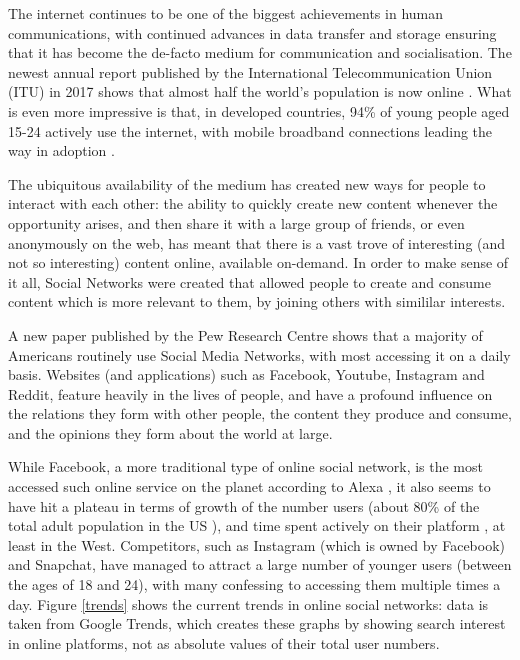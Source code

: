 \documentclass[bsc,frontabs,twoside,singlespacing,parskip,deptreport]{infthesis}
\begin{document}
The internet continues to be one of the biggest achievements in human communications, with continued advances in data transfer and storage ensuring that it has become the de-facto medium for communication and socialisation. The newest annual report published by the International Telecommunication Union (ITU) in 2017 shows that almost half the world's population is now online \cite{ICT2017}. What is even more impressive is that, in developed countries, 94\% of young people aged 15-24 actively use the internet, with mobile broadband connections leading the way in adoption \cite{ICT2017}.

The ubiquitous availability of the medium has created new ways for people to interact with each other: the ability to quickly create new content whenever the opportunity arises, and then share it with a large group of friends, or even anonymously on the web, has meant that there is a vast trove of interesting (and not so interesting) content online, available on-demand. In order to make sense of it all, Social Networks were created that allowed people to create and consume content which is more relevant to them, by joining others with simililar interests.

A new paper published by the Pew Research Centre \cite{pew} shows that a majority of Americans routinely use Social Media Networks, with most accessing it on a daily basis. Websites (and applications) such as Facebook, Youtube, Instagram and Reddit, feature heavily in the lives of people, and have a profound influence on the relations they form with other people, the content they produce and consume, and the opinions they form about the world at large. 

While Facebook, a more traditional type of online social network, is the most accessed such online service on the planet according to Alexa \cite{alexa}, it also seems to have hit a plateau in terms of growth of the number users (about 80\% of the total adult population in the US \cite{pew}), and time spent actively on their platform \cite{pew}, at least in the West. Competitors, such as Instagram (which is owned by Facebook) and Snapchat, have managed to attract a large number of younger users (between the ages of 18 and 24), with many confessing to accessing them multiple times a day. Figure \ref{trends} shows the current trends in online social networks: data is taken from Google Trends, which creates these graphs by showing search interest in online platforms, not as absolute values of their total user numbers. 
\end{document}
